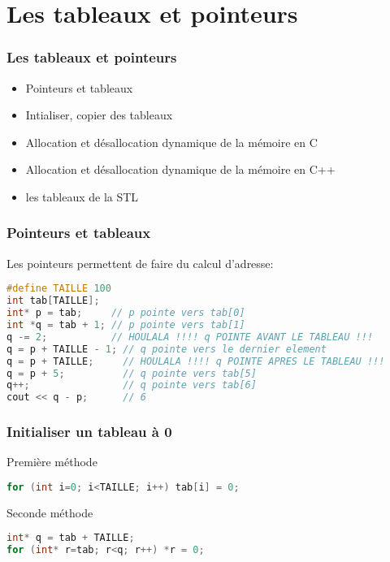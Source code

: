 \documentclass{beamer}
\begin{document}
\section{Les tableaux et pointeurs}

\begin{frame}[fragile=singleslide,shrink=20]
\frametitle{Les tableaux et pointeurs}


\begin{itemize}
\item{Pointeurs et tableaux}
\item{Intialiser, copier des tableaux}
\item{Allocation et désallocation dynamique de la mémoire en C}
\item{Allocation et désallocation dynamique de la mémoire en C++}
\item{les tableaux de la STL}
\end{itemize}



\end{frame}


\begin{frame}[fragile=singleslide,shrink=20]
\frametitle{Pointeurs et tableaux}
Les pointeurs permettent de faire du calcul d'adresse:
\begin{lstlisting}[language=c++]
#define TAILLE 100
int tab[TAILLE];
int* p = tab;     // p pointe vers tab[0]
int *q = tab + 1; // p pointe vers tab[1]
q -= 2;           // HOULALA !!!! q POINTE AVANT LE TABLEAU !!!
q = p + TAILLE - 1; // q pointe vers le dernier element
q = p + TAILLE;     // HOULALA !!!! q POINTE APRES LE TABLEAU !!!
q = p + 5;          // q pointe vers tab[5]
q++;                // q pointe vers tab[6]
cout << q - p;      // 6
\end{lstlisting}
\end{frame}

\begin{frame}[fragile=singleslide,shrink=20]
\frametitle{Initialiser un tableau à 0}
\begin{block}{Première méthode}
\begin{lstlisting}[language=c++]
for (int i=0; i<TAILLE; i++) tab[i] = 0;
\end{lstlisting}
\end{block}
\begin{block}{Seconde méthode}
\begin{lstlisting}[language=c++]
int* q = tab + TAILLE;
for (int* r=tab; r<q; r++) *r = 0;
\end{lstlisting}
\end{block}
\end{frame}
\end{document}
